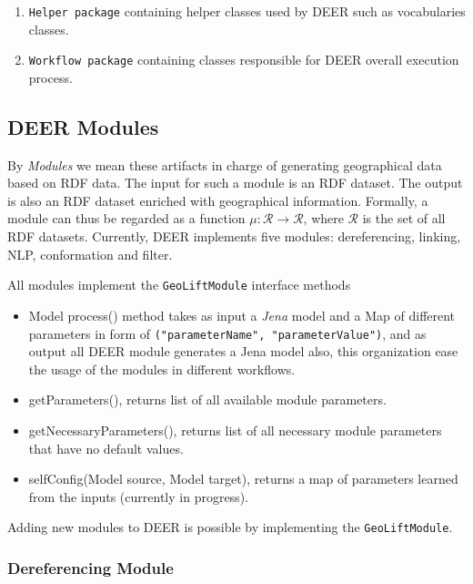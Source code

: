 \documentclass[a4paper,twoside,bibtotoc,abstracton,12pt,BCOR=15mm]{article}
\newcommand{\geolift}{\textsc{DEER}\xspace}
\begin{document}
\begin{enumerate}
  \item \texttt{Helper package} containing helper classes used by \geolift such as vocabularies classes.
  
  \item \texttt{Workflow package} containing classes responsible for \geolift overall execution process.
\end{enumerate}



\subsection{\geolift Modules}
    By \emph{Modules} we mean these artifacts in charge of generating geographical data based on RDF data. 
    The input for such a module is an RDF dataset.
    The output is also an RDF dataset enriched with geographical information.
    Formally, a module can thus be regarded as a function $\mu: \mathcal{R} \rightarrow \mathcal{R}$, where $\mathcal{R}$ is the set of all RDF datasets.
    Currently, \geolift implements five modules: dereferencing, linking, NLP, conformation and filter.

    All modules implement the \texttt{GeoLiftModule} interface methods 
    \begin{itemize}
      \item Model process() method takes as input a \emph{Jena} model and a Map of different parameters in form of \texttt{("parameterName", "parameterValue")},
    and as output all \geolift module generates a Jena model also, this organization ease the usage of the modules in different workflows.
      \item getParameters(), returns list of all available module parameters.
      \item getNecessaryParameters(), returns list of all necessary module parameters that have no default values.
      \item selfConfig(Model source, Model target), returns a map of parameters learned from the inputs (currently in progress).
    \end{itemize}

    Adding new modules to \geolift is possible by implementing the \texttt{GeoLiftModule}.
    \subsubsection{Dereferencing Module}
\end{document}
